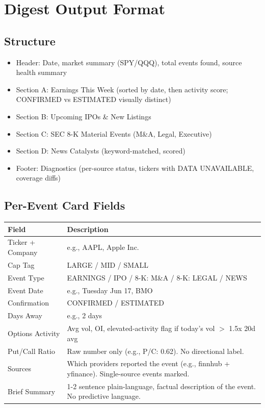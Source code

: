 \documentclass[11pt]{article}
\begin{document}
\section{Digest Output Format}

\subsection{Structure}
\begin{itemize}
  \item Header: Date, market summary (SPY/QQQ), total events found, source health summary
  \item Section A: Earnings This Week (sorted by date, then activity score; CONFIRMED vs ESTIMATED visually distinct)
  \item Section B: Upcoming IPOs \& New Listings
  \item Section C: SEC 8-K Material Events (M\&A, Legal, Executive)
  \item Section D: News Catalysts (keyword-matched, scored)
  \item Footer: Diagnostics (per-source status, tickers with DATA UNAVAILABLE, coverage diffs)
\end{itemize}

\subsection{Per-Event Card Fields}

\begin{tabularx}{\textwidth}{|L{3.6cm}|X|}
\hline
\textbf{Field} & \textbf{Description} \\
\hline
Ticker + Company & e.g., AAPL, Apple Inc. \\
\hline
Cap Tag & LARGE / MID / SMALL \\
\hline
Event Type & EARNINGS / IPO / 8-K: M\&A / 8-K: LEGAL / NEWS \\
\hline
Event Date & e.g., Tuesday Jun 17, BMO \\
\hline
Confirmation & CONFIRMED / ESTIMATED  \\
\hline
Days Away & e.g., 2 days \\
\hline
Options Activity & Avg vol, OI, elevated-activity flag if today's vol $>$ 1.5x 20d avg \\
\hline
Put/Call Ratio & Raw number only (e.g., P/C: 0.62). No directional label. \quad [REVISED in v1.1] \\
\hline
Sources & Which providers reported the event (e.g., finnhub + yfinance). Single-source events marked. \quad [NEW in v1.1] \\
\hline
Brief Summary & 1-2 sentence plain-language, factual description of the event. No predictive language. \\
\hline
\end{tabularx}
\end{document}
